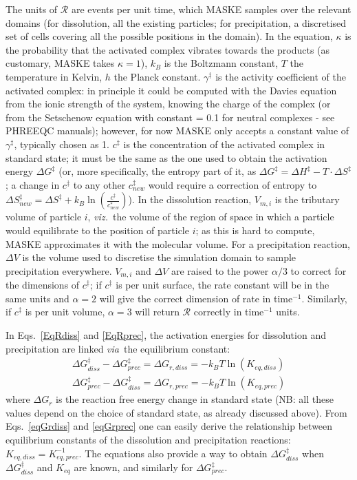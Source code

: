\documentclass[12pt]{paper}    %
\newcommand{\RR}{\mathscr{R}}
\newcommand{\via}{\textit{via}~}
\newcommand{\viz}{\textit{viz.}~}
\newcommand{\eqnames}{Eqs.~}
\begin{document}
The units of $\RR$ are events per unit time, which MASKE samples over the relevant domains (for dissolution, all the existing particles; for precipitation, a discretised set of cells covering all the possible positions in the domain). In the equation, $\kappa$ is the probability that the activated complex vibrates towards the products (as customary, MASKE takes $\kappa = 1$), $k_B$ is the Boltzmann constant, $T$ the temperature in Kelvin, $h$ the Planck constant. $\gamma^\ddag$ is the activity coefficient of the activated complex: in principle it could be computed with the Davies equation \cite{davies1962butterworths} from the ionic strength of the system, knowing the charge of the complex (or from the Setschenow equation \cite{setschenow1889konstitution} with constant = 0.1 for neutral complexes - see PHREEQC manuals); however, for now MASKE only accepts a constant value of $\gamma^\ddag$, typically chosen as 1. $c^\ddag$ is the concentration of the activated complex in standard state; it must be the same as the one used to obtain the activation energy $\Delta G^\ddag$ (or, more specifically, the entropy part of it, as $\Delta G^\ddag = \Delta H^\ddag - T\cdot \Delta S^\ddag$; a change in $c^\ddag$ to any other $c^\ddag_{new}$ would require a correction of entropy to $\Delta S^\ddag_{new}  = \Delta S^\ddag +k_B \ln\left(\frac{c^\ddag}{c^*_{new}}\right)$). In the dissolution reaction, $V_{m,i}$ is the tributary volume of particle $i$, \viz the volume of the region of space in which a particle would equilibrate to the position of particle $i$; as this is hard to compute, MASKE approximates it with the molecular volume. For a precipitation reaction,$\Delta V$ is the volume used to discretise the simulation domain to sample precipitation everywhere. $V_{m,i}$ and $\Delta V$ are raised to the power $\alpha/3$ to correct for the dimensions of $c^\ddag$; if $c^\ddag$ is per unit surface, the rate constant will be in the same units and $\alpha = 2$ will give the correct dimension of rate in time$^{-1}$. Similarly, if $c^\ddag$ is per unit volume, $\alpha = 3$ will return $\RR$ correctly in time$^{-1}$ units.

In \eqnames\ref{EqRdiss} and \ref{EqRprec}, the activation energies for dissolution and precipitation are linked \via the equilibrium constant: 
\begin{align}
\Delta G_{diss}^\ddag - \Delta G_{prec}^\ddag = \Delta G_{r,diss} = -k_BT\ln(K_{eq,diss})   \label{eqGrdiss}\\
%
\Delta G_{prec}^\ddag - \Delta G_{diss}^\ddag = \Delta G_{r,prec} = -k_BT\ln(K_{eq,prec})  \label{eqGrprec}
\end{align}
where $\Delta G_r$ is the reaction free energy change in standard state (NB: all these values depend on the choice of standard state, as already discussed above). From \eqnames\ref{eqGrdiss} and \ref{eqGrprec} one can easily derive the relationship between equilibrium constants of the dissolution and precipitation reactions: $K_{eq,diss} = K_{eq,prec}^{-1}$. The equations also provide a way to obtain $\Delta G^\ddag_{diss}$ when  $\Delta G^\ddag_{diss}$ and $K_{eq}$ are known, and similarly for $\Delta G^\ddag_{prec}$.
\end{document}
